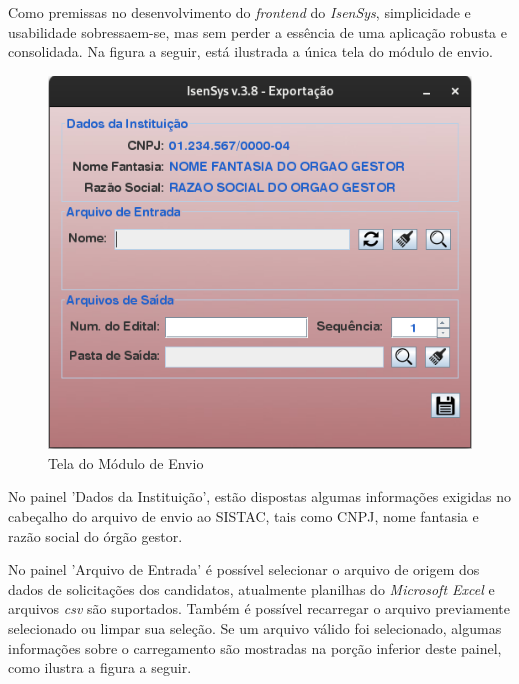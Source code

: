 \documentclass[
	12pt,			%
	openright,		%
	oneside,	
	a4paper,		%
	english,		%
	brazil			%
]{abntex2/abntex2}  %
\begin{document}
				Como premissas no desenvolvimento do \textit{frontend} do \textit{IsenSys}, simplicidade e usabilidade sobressaem-se, mas sem perder a essência de uma aplicação robusta e consolidada. Na figura a seguir, está ilustrada a única tela do módulo de envio.
	
				\begin{figure}[ht]
					\begin{center}
						
						\caption{Tela do Módulo de Envio}
						\label{envio-ui}
						
						\includegraphics[scale=0.6]{img/envio-ui}
						
					\end{center}
				\end{figure}
	
				No painel 'Dados da Instituição', estão dispostas algumas informações exigidas no cabeçalho do arquivo de envio ao SISTAC, tais como CNPJ, nome fantasia e razão social do órgão gestor.
	
				No painel 'Arquivo de Entrada' é possível selecionar o arquivo de origem dos dados de solicitações dos candidatos, atualmente planilhas do \textit{Microsoft Excel} e arquivos \textit{csv} são suportados. Também é possível recarregar o arquivo previamente selecionado ou limpar sua seleção. Se um arquivo válido foi selecionado, algumas informações sobre o carregamento são mostradas na porção inferior deste painel, como ilustra a figura a seguir.
	
\end{document}
